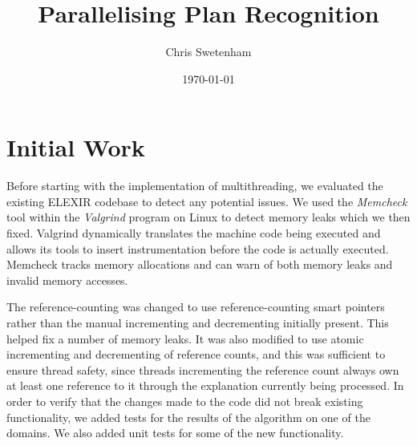 \documentclass[12pt,twoside,abbrevs,msc,ai,notimes,logo,sansheadings]{infthesis}
\title{Parallelising Plan Recognition}
\author{Chris Swetenham}
\date{\today}
\begin{document}
  \begin{preliminary}
    \maketitle

    
    \standarddeclaration
    \tableofcontents
    \listoffigures
  \end{preliminary}


  
  
  
  
  \chapter{Initial Work}
  Before starting with the implementation of multithreading, we evaluated the existing ELEXIR codebase to detect any potential issues. We used the \emph{Memcheck} tool within the \emph{Valgrind} program on Linux to detect memory leaks which we then fixed. Valgrind dynamically translates the machine code being executed and allows its tools to insert instrumentation before the code is actually executed. Memcheck tracks memory allocations and can warn of both memory leaks and invalid memory accesses.
  
  The reference-counting was changed to use reference-counting smart pointers rather than the manual incrementing and decrementing initially present. This helped fix a number of memory leaks. It was also modified to use atomic incrementing and decrementing of reference counts, and this was sufficient to ensure thread safety, since threads incrementing the reference count always own at least one reference to it through the explanation currently being processed. In order to verify that the changes made to the code did not break existing functionality, we added tests for the results of the algorithm on one of the domains. We also added unit tests for some of the new functionality.
  
\end{document}
